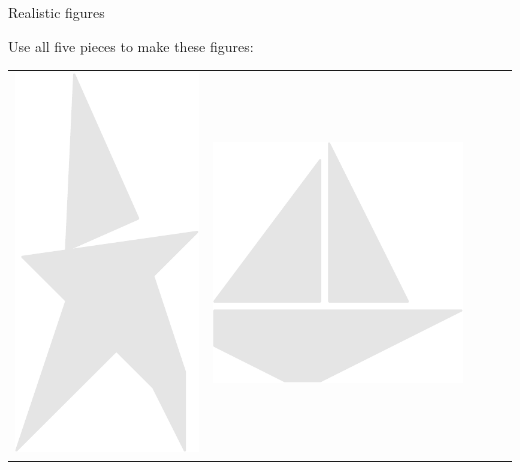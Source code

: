 \documentclass[14pt]{beamer}
\begin{document}
    \begin{frame}{Realistic figures}
        \vspace{-1em}
        \begin{center}
            \quad Use all five pieces to make these figures:

            \vspace{-0.8em}
            
            {\footnotesize
            \begin{tabular}{ccccc}
                \includegraphics[scale=0.21]{figures/figure026aa.pdf}&
                \includegraphics[scale=0.21]{figures/figure026c.pdf} &

\end{tabular}}
\end{center}
\end{frame}
\end{document}
